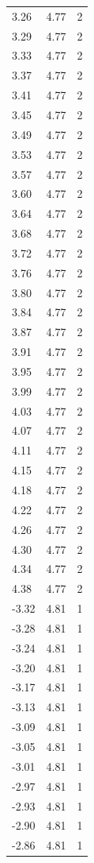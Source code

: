 \begin{longtable}{lrr}
  3.26 & 4.77 & 2 \\
  3.29 & 4.77 & 2 \\
  3.33 & 4.77 & 2 \\
  3.37 & 4.77 & 2 \\
  3.41 & 4.77 & 2 \\
  3.45 & 4.77 & 2 \\
  3.49 & 4.77 & 2 \\
  3.53 & 4.77 & 2 \\
  3.57 & 4.77 & 2 \\
  3.60 & 4.77 & 2 \\
  3.64 & 4.77 & 2 \\
  3.68 & 4.77 & 2 \\
  3.72 & 4.77 & 2 \\
  3.76 & 4.77 & 2 \\
  3.80 & 4.77 & 2 \\
  3.84 & 4.77 & 2 \\
  3.87 & 4.77 & 2 \\
  3.91 & 4.77 & 2 \\
  3.95 & 4.77 & 2 \\
  3.99 & 4.77 & 2 \\
  4.03 & 4.77 & 2 \\
  4.07 & 4.77 & 2 \\
  4.11 & 4.77 & 2 \\
  4.15 & 4.77 & 2 \\
  4.18 & 4.77 & 2 \\
  4.22 & 4.77 & 2 \\
  4.26 & 4.77 & 2 \\
  4.30 & 4.77 & 2 \\
  4.34 & 4.77 & 2 \\
  4.38 & 4.77 & 2 \\
  -3.32 & 4.81 & 1 \\
  -3.28 & 4.81 & 1 \\
  -3.24 & 4.81 & 1 \\
  -3.20 & 4.81 & 1 \\
  -3.17 & 4.81 & 1 \\
  -3.13 & 4.81 & 1 \\
  -3.09 & 4.81 & 1 \\
  -3.05 & 4.81 & 1 \\
  -3.01 & 4.81 & 1 \\
  -2.97 & 4.81 & 1 \\
  -2.93 & 4.81 & 1 \\
  -2.90 & 4.81 & 1 \\
  -2.86 & 4.81 & 1 \\

\end{longtable}
